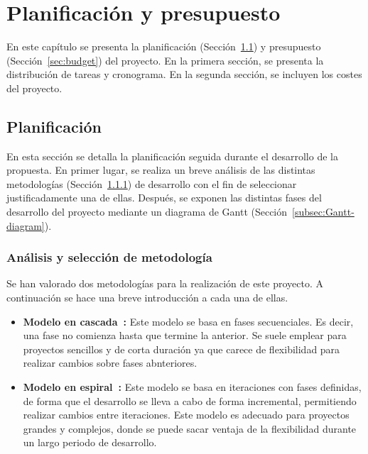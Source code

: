 \chapter{Planificación y presupuesto}\label{chap:planning}
En este capítulo se presenta la planificación (Sección~\ref{sec:planning}) y presupuesto (Sección~\ref{sec:budget}) del proyecto. En la primera sección, se presenta la distribución de tareas y cronograma. En la segunda sección, se incluyen los costes del proyecto.

\section{Planificación}\label{sec:planning}
En esta sección se detalla la planificación seguida durante el desarrollo de la propuesta. En primer lugar, se realiza un breve análisis de las distintas metodologías (Sección~\ref{subsec:metodology}) de desarrollo con el fin de seleccionar justificadamente una de ellas. Después, se exponen las distintas fases del desarrollo del proyecto mediante un diagrama de Gantt (Sección~\ref{subsec:Gantt-diagram}).

\subsection{Análisis y selección de metodología}\label{subsec:metodology}
Se han valorado dos metodologías para la realización de este proyecto. A continuación se hace una breve introducción a cada una de ellas.

\begin{itemize}
    \item \textbf{Modelo en cascada~\cite{cascade}:} Este modelo se basa en fases secuenciales. Es decir, una fase no comienza hasta que termine la anterior. Se suele emplear para proyectos sencillos y de corta duración ya que carece de flexibilidad para realizar cambios sobre fases abnteriores.
    \item \textbf{Modelo en espiral~\cite{spiral}:} Este modelo se basa en iteraciones con fases definidas, de forma que el desarrollo se lleva a cabo de forma incremental, permitiendo realizar cambios entre iteraciones. Este modelo es adecuado para proyectos grandes y complejos, donde se puede sacar ventaja de la flexibilidad durante un largo periodo de desarrollo.
\end{itemize}

